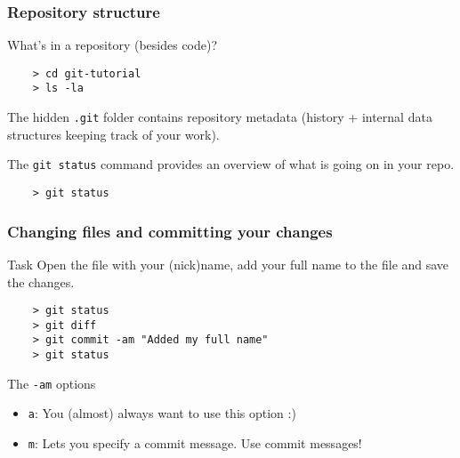 
\begin{frame}[fragile]
	\frametitle{Repository structure}
	
	What's in a repository (besides code)?
	
	\begin{verbatim}
	> cd git-tutorial
	> ls -la
	\end{verbatim}
	
	The hidden \texttt{.git} folder contains repository metadata (history + internal data structures keeping track of your work).
	
	The \texttt{git status} command provides an overview of what is going on in your repo.
	\begin{verbatim}
	> git status
	\end{verbatim}
	
\end{frame}


\begin{frame}[fragile]
	\frametitle{Changing files and committing your changes}
	
	\begin{block}{Task}
	Open the file with your (nick)name, add your full name to the file and save the changes.
	\end{block}
	\begin{verbatim}
	> git status
	> git diff
	> git commit -am "Added my full name"
	> git status
	\end{verbatim}
	
	\begin{block}{The \texttt{-am} options}
	\begin{itemize}
		\item \texttt{a}: You (almost) always want to use this option :)
		\item \texttt{m}: Lets you specify a commit message. \alert{Use commit messages!}
	\end{itemize}
	\end{block}
	
\end{frame}


